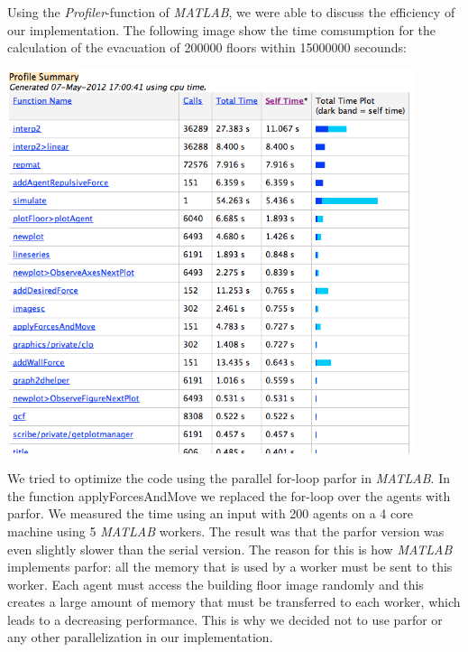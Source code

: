 \documentclass[11pt]{article}
\begin{document}

Using the \textit{Profiler}-function of \textit{MATLAB}, we were able to discuss the efficiency of our implementation. The following image show the time comsumption for the calculation of the evacuation of 200000 floors within 15000000 secounds: %

\medskip

\begin{center}
	\includegraphics[width=0.9\textwidth]{./images/profiler.png}
\end{center}

We tried to optimize the code using the parallel for-loop parfor in \textit{MATLAB}. In
the function applyForcesAndMove we replaced the for-loop over the agents with
parfor. We measured the time using an input with 200 agents on a 4 core machine
using 5 \textit{MATLAB} workers. The result was that the parfor version was even slightly
slower than the serial version. The reason for this is how \textit{MATLAB} implements
parfor: all the memory that is used by a worker must be sent to this worker.
Each agent must access the building floor image randomly and this creates a
large amount of memory that must be transferred to each worker, which leads to a
decreasing performance.
This is why we decided not to use parfor or any other parallelization in our
implementation.
\end{document}
